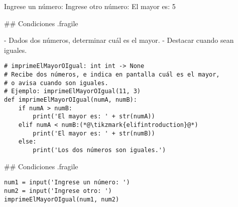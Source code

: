 

\begin{exampleConsole}
Ingrese un número: 
Ingrese otro número: 
El mayor es: 5
\end{exampleConsole}

\trmcolumns

\pause

\vspace{-3ex}


## Condiciones {.fragile}


\vspace{-3ex}

- Dados dos números, determinar cuál es el mayor.
    - \alert{Destacar cuando sean iguales.}

\begin{lstlisting}
# imprimeElMayorOIgual: int int -> None
# Recibe dos números, e indica en pantalla cuál es el mayor,
# o avisa cuando son iguales.
# Ejemplo: imprimeElMayorOIgual(11, 3)
def imprimeElMayorOIgual(numA, numB):
    if numA > numB:
        print('El mayor es: ' + str(numA))
    elif numA < numB:(*@\tikzmark{elifintroduction}@*)
        print('El mayor es: ' + str(numB))
    else:
        print('Los dos números son iguales.')
\end{lstlisting}

\vspace{-3ex}

## Condiciones {.fragile}

\vspace{-3ex}

\bgncolumns
{}
\vspace{-1ex}


\begin{lstlisting}
num1 = input('Ingrese un número: ')
num2 = input('Ingrese otro: ')
imprimeElMayorOIgual(num1, num2)
\end{lstlisting}


